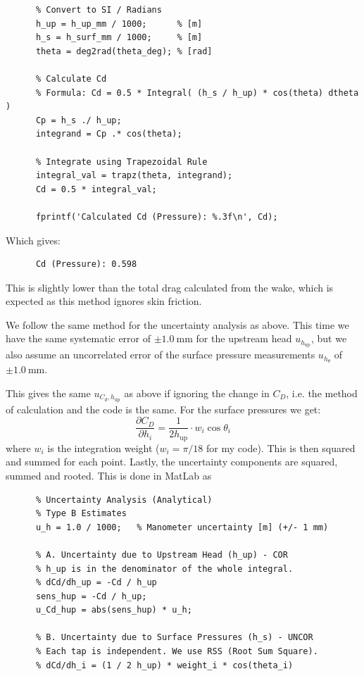 \begin{derivation}
\begin{verbatim}
      % Convert to SI / Radians
      h_up = h_up_mm / 1000;      % [m]
      h_s = h_surf_mm / 1000;     % [m]
      theta = deg2rad(theta_deg); % [rad]

      % Calculate Cd
      % Formula: Cd = 0.5 * Integral( (h_s / h_up) * cos(theta) dtheta )
      Cp = h_s ./ h_up;
      integrand = Cp .* cos(theta);

      % Integrate using Trapezoidal Rule
      integral_val = trapz(theta, integrand);
      Cd = 0.5 * integral_val;

      fprintf('Calculated Cd (Pressure): %.3f\n', Cd);
    \end{verbatim}
    Which gives:
    \begin{verbatim}
      Cd (Pressure): 0.598
    \end{verbatim}
    This is slightly lower than the total drag calculated from the wake, which is expected as this method ignores skin friction.

    We follow the same method for the uncertainty analysis as above.
    This time we have the same systematic error of $\pm \qty{1,0}{\mm}$ for the upstream head $u_{h_{\text{up}}}$, but we also assume an uncorrelated error of the surface pressure measurements $u_{h_\theta}$ of $\pm \qty{1,0}{\mm}$.

    This gives the same $u_{C_d, h_{\text{up}}}$ as above if ignoring the change in $C_D$, i.e. the method of calculation and the code is the same.
    For the surface pressures we get:
    \begin{equation*}
      \frac{\partial C_D}{\partial h_i} = \frac{1}{2 h_{\text{up}}} \cdot w_i \cos \theta_i
    \end{equation*}
    where $w_i$ is the integration weight ($w_i = \pi / 18$ for my code).
    This is then squared and summed for each point.
    Lastly, the uncertainty components are squared, summed and rooted.
    This is done in MatLab as
    \begin{verbatim}
      % Uncertainty Analysis (Analytical)
      % Type B Estimates
      u_h = 1.0 / 1000;   % Manometer uncertainty [m] (+/- 1 mm)

      % A. Uncertainty due to Upstream Head (h_up) - COR
      % h_up is in the denominator of the whole integral.
      % dCd/dh_up = -Cd / h_up
      sens_hup = -Cd / h_up;
      u_Cd_hup = abs(sens_hup) * u_h;

      % B. Uncertainty due to Surface Pressures (h_s) - UNCOR
      % Each tap is independent. We use RSS (Root Sum Square).
      % dCd/dh_i = (1 / 2 h_up) * weight_i * cos(theta_i)


\end{verbatim}
\end{derivation}
